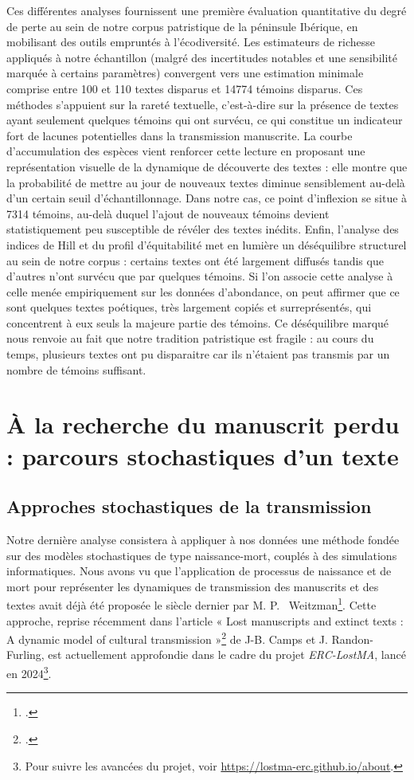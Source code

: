 \documentclass[a4paper,twoside,12pt]{book}
\begin{document}
Ces différentes analyses fournissent une première évaluation quantitative du degré de perte au sein de notre corpus patristique de la péninsule Ibérique, en mobilisant des outils empruntés à l’écodiversité. Les estimateurs de richesse appliqués à notre échantillon (malgré des incertitudes notables et une sensibilité marquée à certains paramètres) convergent vers une estimation minimale comprise entre 100 et 110 textes disparus et 14774 témoins disparus. Ces méthodes s’appuient sur la rareté textuelle, c’est-à-dire sur la présence de textes ayant seulement quelques témoins qui ont survécu, ce qui constitue un indicateur fort de lacunes potentielles dans la transmission manuscrite. La courbe d’accumulation des espèces vient renforcer cette lecture en proposant une représentation visuelle de la dynamique de découverte des textes : elle montre que la probabilité de mettre au jour de nouveaux textes diminue sensiblement au-delà d’un certain seuil d’échantillonnage. Dans notre cas, ce point d’inflexion se situe à 7314 témoins, au-delà duquel l’ajout de nouveaux témoins devient statistiquement peu susceptible de révéler des textes inédits.
Enfin, l’analyse des indices de Hill et du profil d’équitabilité met en lumière un déséquilibre structurel au sein de notre corpus : certains textes ont été largement diffusés tandis que d'autres n'ont survécu que par quelques témoins. Si l'on associe cette analyse à celle menée empiriquement sur les données d'abondance, on peut affirmer que ce sont quelques textes poétiques, très largement copiés et surreprésentés, qui concentrent à eux seuls la majeure partie des témoins. Ce déséquilibre marqué nous renvoie au fait que notre tradition patristique est fragile : au cours du temps, plusieurs textes ont pu disparaitre car ils n'étaient pas transmis par un nombre de témoins suffisant.


\part{ À la recherche du manuscrit perdu : parcours stochastiques d’un texte}

\chapter{Approches stochastiques de la transmission}

Notre dernière analyse consistera à appliquer à nos données une méthode fondée sur des modèles stochastiques de type naissance-mort, couplés à des simulations informatiques. Nous avons vu que l'application de processus de naissance et de mort pour représenter les dynamiques de transmission des manuscrits et des textes avait déjà été proposée le siècle dernier par M. P.~ Weitzman\footcite{weitzman1987evolution}. Cette approche, reprise récemment dans l'article « Lost manuscripts and extinct texts : A dynamic model of cultural transmission »\footcite{Camps2022} de J-B. Camps et J. Randon-Furling, est actuellement approfondie dans le cadre du projet \textit{ERC-LostMA}, lancé en 2024\footnote{Pour suivre les avancées du projet, voir \url{https://lostma-erc.github.io/about}.}.
\end{document}

